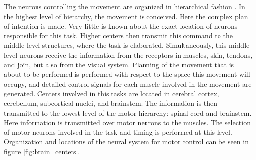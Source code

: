 The neurons controlling the movement are organized in hierarchical fashion \citep{Widmaier2014}. In the highest level of hierarchy, the movement is conceived. Here the complex plan of intention is made. Very little is known about the exact location of neurons responsible for this task. Higher centers then transmit this command to the middle level structures, where the task is elaborated. Simultaneously, this middle level neurons receive the information from the receptors in muscles, skin, tendons, and join, but also from the visual system. Planning of the movement that is about to be performed is performed with respect to the space this movement will occupy, and detailed control signals for each muscle involved in the movement are generated. Centers involved in this tasks are located in cerebral cortex, cerebellum, subcortical nuclei, and brainstem. The information is then transmitted to the lowest level of the motor hierarchy: spinal cord and brainstem. Here information is transmitted over motor neurons to the muscles. The selection of motor neurons involved in the task and timing is performed at this level. Organization and locations of the neural system for motor control can be seen in figure \ref{fig:brain_centers}. 
